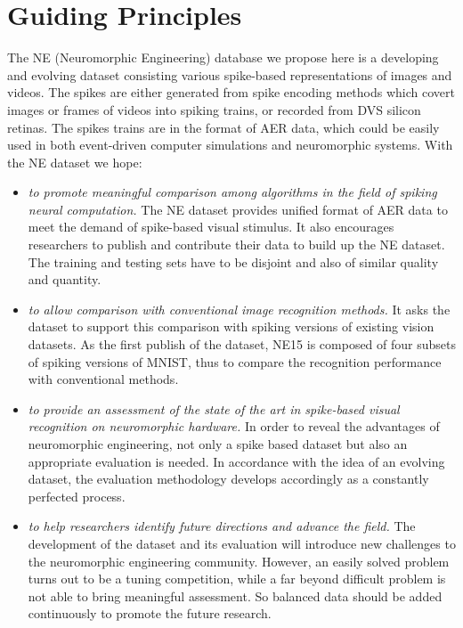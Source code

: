 \section{Guiding Principles}
\label{sec:guide}
The NE (Neuromorphic Engineering) database we propose here is a developing and evolving dataset consisting various spike-based representations of images and videos.
The spikes are either generated from spike encoding methods which covert images or frames of videos into spiking trains, or recorded from DVS silicon retinas.
The spikes trains are in the format of AER data, which could be easily used in both event-driven computer simulations and neuromorphic systems.
With the NE dataset we hope:
\begin{itemize}
	\item \textit{to promote meaningful comparison among algorithms in the field of spiking neural computation.}
	The NE dataset provides unified format of AER data to meet the demand of spike-based visual stimulus.
	It also encourages researchers to publish and contribute their data to build up the NE dataset.
	The training and testing sets have to be disjoint and also of similar quality and quantity.
	\item \textit{to allow comparison with conventional image recognition methods.}
	It asks the dataset to support this comparison with spiking versions of existing vision datasets.
	As the first publish of the dataset, NE15 is composed of four subsets of spiking versions of MNIST, thus to compare the recognition performance with conventional methods. 
	\item \textit{to provide an assessment of the state of the art in spike-based visual recognition on neuromorphic hardware.}
	In order to reveal the advantages of neuromorphic engineering, not only a spike based dataset but also an appropriate evaluation is needed.
	In accordance with the idea of an evolving dataset, the evaluation methodology develops accordingly as a constantly perfected process.
	\item \textit{to help researchers identify future directions and advance the field.}
	The development of the dataset and its evaluation will introduce new challenges to the neuromorphic engineering community.
	However, an easily solved problem turns out to be a tuning competition, while a far beyond difficult problem is not able to bring meaningful assessment.
	So balanced data should be added continuously to promote the future research.  
\end{itemize}
